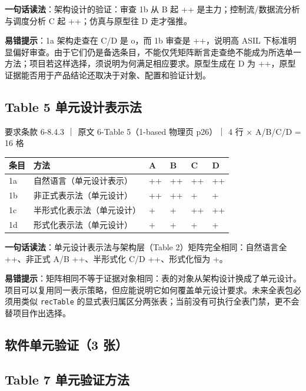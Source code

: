 \textbf{一句话读法}：架构设计的验证：审查 1b 从 B 起 ++ 是主力；控制流/数据流分析与调度分析 C 起 ++；仿真与原型往 D 走才强推。

\textbf{易错提示}：1a 架构走查在 C/D 是 o，而 1b 审查是 ++，说明高 ASIL 下标准明显偏好审查。由于它们仍是备选条目，不能仅凭矩阵断言走查绝不能成为所选单一方法；项目若这样选择，须说明为何满足相应要求。原型生成在 D 为 ++，原型证据能否用于产品结论还取决于对象、配置和验证计划。

\subsection{Table 5 单元设计表示法}

要求条款 6-8.4.3 ｜ 原文 6-Table 5（1-based 物理页 p26）｜ 4 行 \(\times\) A/B/C/D = 16 格

\begin{center}
\begingroup\small
\setlength{\tabcolsep}{4pt}
\begin{tabularx}{\linewidth}{@{}XXXXXX@{}}
\toprule
条目 & 方法 & A & B & C & D \\
\midrule
1a & 自然语言（单元设计表示） & ++ & ++ & ++ & ++ \\
1b & 非正式表示法（单元设计） & ++ & ++ & + & + \\
1c & 半形式化表示法（单元设计） & + & + & ++ & ++ \\
1d & 形式化表示法（单元设计） & + & + & + & + \\
\bottomrule
\end{tabularx}
\endgroup
\end{center}

\textbf{一句话读法}：单元设计表示法与架构层（Table 2）矩阵完全相同：自然语言全 ++、非正式 A/B ++、半形式化 C/D ++、形式化恒为 +。

\textbf{易错提示}：矩阵相同不等于证据对象相同：表的对象从架构设计换成了单元设计。项目可以复用同一表示策略，但应能说明它如何覆盖单元设计要求。未来全表包必须用类似 \nolinkurl{recTable} 的显式表归属区分两张表；当前没有可执行全表门禁，更不会替项目作出选择。

\subsection{软件单元验证（3 张）}

\subsection{Table 7 单元验证方法}

